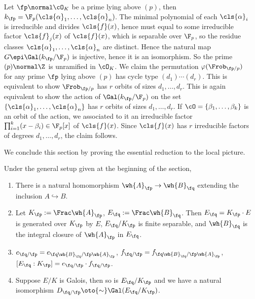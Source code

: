 \documentclass[11pt]{amsart}
\begin{document}
Let $\fp \normal \cO_K$ be a prime lying above $(p)$, then $k_\fp =
\F_p(\cls{\alpha}_1, \ldots, \cls{\alpha}_n)$.  The minimal polynomial of each
$\cls{\alpha}_i$ is irreducible and divides $\cls{f}(x)$, hence must equal to
some irreducible factor $\cls{f}_j(x)$ of $\cls{f}(x)$, which is separable over
$\F_p$, so the residue classes $\cls{\alpha}_1, \ldots, \cls{\alpha}_n$ are
distinct.  Hence the natural map $G \epi \Gal(k_\fp/\F_p)$ is injective, hence
it is an isomorphism.  So the prime $(p) \normal \Z$ is unramified in $\cO_K$.
We claim the permutation $\varphi(\Frob_{\fp/p})$ for any prime $\fp$ lying
above $(p)$ has cycle type $(d_1) \cdots (d_r)$.  This is equivalent to show
$\Frob_{\fp/p}$ has $r$ orbits of sizes $d_1, \ldots, d_r$.  This is again
equivalent to show the action of $\Gal(k_\fp/\F_p)$ on the set
$\{\cls{\alpha}_1, \ldots, \cls{\alpha}_n\}$ has $r$ orbits of sizes $d_1,
\ldots, d_r$.  If $\cO = \{\beta_1, \ldots, \beta_{k}\}$ is an orbit of the
action, we associated to it an irreducible factor $\prod_{i=1}^{k} (x -
\beta_i) \in \F_p[x]$ of $\cls{f}(x)$.  Since $\cls{f}(x)$ has $r$ irreducible
factors of degrees $d_1, \ldots, d_r$, the claim follows.

\medskip

We conclude this section by proving the essential reduction to the local
picture.

\begin{prop}
    \label{prop:global-local}
    Under the general setup given at the beginning of the section,
    \begin{enumerate}
        \item There is a natural homomorphism $\wh{A}_\fp \to \wh{B}_\fq$
            extending the inclusion $A \hookrightarrow B$.
        \item Let $K_\fp := \Frac \wh{A}_\fp$, $E_\fq := \Frac \wh{B}_\fq$.
            Then $E_\fq = K_\fp \cdot E$ is generated over $K_\fp$ by $E$, 
            $E_\fq/K_\fp$ is finite separable, and $\wh{B}_\fq$ is the integral
            closure of $\wh{A}_\fp$ in $E_{\fq}$.
        \item $e_{\fq/\fp} = e_{\fq\wh{B}_\fq/\fp\wh{A}_\fp}$,
            $f_{\fq/\fp} = f_{\fq\wh{B}_\fq/\fp\wh{A}_\fp}$,
            $[E_\fq : K_\fp] = e_{\fq/\fp} \cdot f_{\fq/\fp}$.
        \item Suppose $E/K$ is Galois, then so is $E_\fq/K_\fp$ and we have a
            natural isomorphism $D_{\fq/\fp} \oto{\sim} \Gal(E_{\fq}/K_{\fp})$.
    \end{enumerate}
\end{prop}
\end{document}

